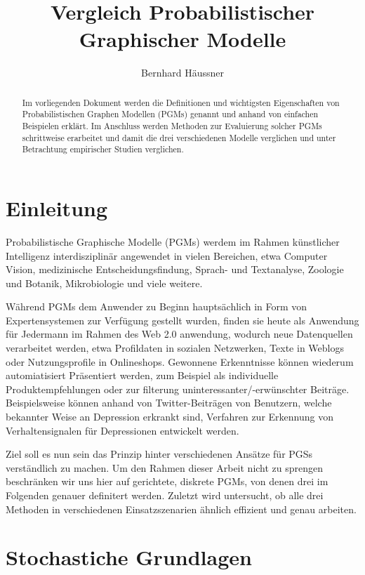 \documentclass{llncs}
\title{Vergleich Probabilistischer Graphischer Modelle}
\author{Bernhard Häussner}
\institute{LS für Künstliche Intelligenz und Angewandte Informatik der Universität Würzburg}
\begin{document}
\maketitle

\begin{abstract}
Im vorliegenden Dokument werden die Definitionen und wichtigsten Eigenschaften von Probabilistischen Graphen Modellen (PGMs) genannt und anhand von einfachen Beispielen erklärt. Im Anschluss werden Methoden zur Evaluierung solcher PGMs schrittweise erarbeitet und damit die drei verschiedenen Modelle verglichen und unter Betrachtung empirischer Studien verglichen. 
\end{abstract}


\section{Einleitung}

Probabilistische Graphische Modelle (PGMs) werdem im Rahmen künstlicher Intelligenz interdisziplinär angewendet in vielen Bereichen, etwa Computer Vision, medizinische Entscheidungsfindung, Sprach- und Textanalyse, Zoologie und Botanik, Mikrobiologie und viele weitere. 

Während PGMs dem Anwender zu Beginn hauptsächlich in Form von Expertensystemen zur Verfügung gestellt wurden, finden sie heute als Anwendung für Jedermann im Rahmen des Web 2.0 anwendung, wodurch neue Datenquellen verarbeitet werden, etwa Profildaten in sozialen Netzwerken, Texte in Weblogs oder Nutzungsprofile in Onlineshops. Gewonnene Erkenntnisse können wiederum automiatisiert Präsentiert werden, zum Beispiel als individuelle Produktempfehlungen oder zur filterung uninteressanter/-erwünschter Beiträge. Beispielsweise können anhand von Twitter-Beiträgen von Benutzern, welche bekannter Weise an Depression erkrankt sind, Verfahren zur Erkennung von Verhaltensignalen für Depressionen entwickelt werden\cite{dechoudhury2013predicting}.

Ziel soll es nun sein das Prinzip hinter verschiedenen Ansätze für PGSs verständlich zu machen. Um den Rahmen dieser Arbeit nicht zu sprengen beschränken wir uns hier auf gerichtete, diskrete PGMs, von denen drei im Folgenden genauer definitert werden. Zuletzt wird untersucht, ob alle drei Methoden in verschiedenen Einsatzszenarien ähnlich effizient und genau arbeiten. 

\section{Stochastiche Grundlagen}
\end{document}
